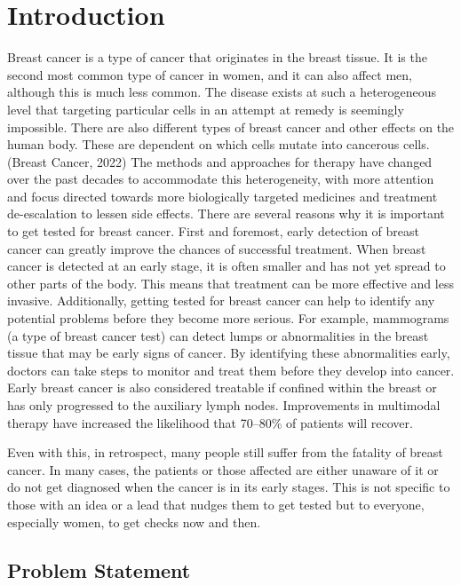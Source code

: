 \documentclass[10pt,twocolumn,letterpaper]{article}
\begin{document}
\section{Introduction}
\label{sec:intro}

Breast cancer is a type of cancer that originates in the breast tissue. It is the second most common type of cancer in women, and it can also affect men, although this is much less common.  The disease exists at such a heterogeneous level that targeting particular cells in an attempt at remedy is seemingly impossible. There are also different types of breast cancer and other effects on the human body. These are dependent on which cells mutate into cancerous cells. (Breast Cancer, 2022) The methods and approaches for therapy have changed over the past decades to accommodate this heterogeneity, with more attention and focus directed towards more biologically targeted medicines and treatment de-escalation to lessen side effects. 
There are several reasons why it is important to get tested for breast cancer. First and foremost, early detection of breast cancer can greatly improve the chances of successful treatment. When breast cancer is detected at an early stage, it is often smaller and has not yet spread to other parts of the body. This means that treatment can be more effective and less invasive.
Additionally, getting tested for breast cancer can help to identify any potential problems before they become more serious. For example, mammograms (a type of breast cancer test) can detect lumps or abnormalities in the breast tissue that may be early signs of cancer. By identifying these abnormalities early, doctors can take steps to monitor and treat them before they develop into cancer.
Early breast cancer is also considered treatable if confined within the breast or has only progressed to the auxiliary lymph nodes. Improvements in multimodal therapy have increased the likelihood that 70–80\% of patients will recover. \cite{Harbeck}

Even with this, in retrospect, many people still suffer from the fatality of breast cancer. In many cases, the patients or those affected are either unaware of it or do not get diagnosed when the cancer is in its early stages. This is not specific to those with an idea or a lead that nudges them to get tested but to everyone, especially women, to get checks now and then.
\subsection{Problem Statement}
\end{document}
